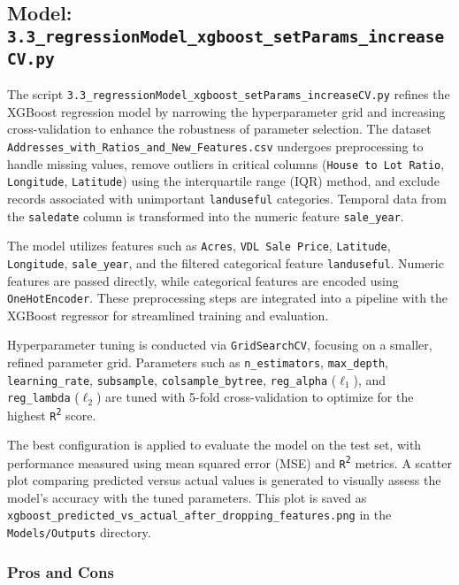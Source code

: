 \subsection{Model: \texttt{3.3\_regressionModel\_xgboost\_setParams\_increaseCV.py}}

The script \texttt{3.3\_regressionModel\_xgboost\_setParams\_increaseCV.py} refines the XGBoost regression model by narrowing the hyperparameter grid and increasing cross-validation to enhance the robustness of parameter selection. The dataset \texttt{Addresses\_with\_Ratios\_and\_New\_Features.csv} undergoes preprocessing to handle missing values, remove outliers in critical columns (\texttt{House to Lot Ratio}, \texttt{Longitude}, \texttt{Latitude}) using the interquartile range (IQR) method, and exclude records associated with unimportant \texttt{landuseful} categories. Temporal data from the \texttt{saledate} column is transformed into the numeric feature \texttt{sale\_year}.

The model utilizes features such as \texttt{Acres}, \texttt{VDL Sale Price}, \texttt{Latitude}, \texttt{Longitude}, \texttt{sale\_year}, and the filtered categorical feature \texttt{landuseful}. Numeric features are passed directly, while categorical features are encoded using \texttt{OneHotEncoder}. These preprocessing steps are integrated into a pipeline with the XGBoost regressor for streamlined training and evaluation.

Hyperparameter tuning is conducted via \texttt{GridSearchCV}, focusing on a smaller, refined parameter grid. Parameters such as \texttt{n\_estimators}, \texttt{max\_depth}, \texttt{learning\_rate}, \texttt{subsample}, \texttt{colsample\_bytree}, \texttt{reg\_alpha} (\(\ell_1\)), and \texttt{reg\_lambda} (\(\ell_2\)) are tuned with 5-fold cross-validation to optimize for the highest \texttt{R\textsuperscript{2}} score.

The best configuration is applied to evaluate the model on the test set, with performance measured using mean squared error (MSE) and \texttt{R\textsuperscript{2}} metrics. A scatter plot comparing predicted versus actual values is generated to visually assess the model’s accuracy with the tuned parameters. This plot is saved as \texttt{xgboost\_predicted\_vs\_actual\_after\_dropping\_features.png} in the \texttt{Models/Outputs} directory.

\subsubsection*{Pros and Cons}

